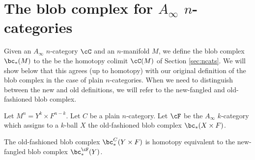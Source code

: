 
\section{The blob complex for $A_\infty$ $n$-categories}
\label{sec:ainfblob}

Given an $A_\infty$ $n$-category $\cC$ and an $n$-manifold $M$, we define the blob
complex $\bc_*(M)$ to the be the homotopy colimit $\cC(M)$ of Section \ref{sec:ncats}.
We will show below 
that this agrees (up to homotopy) with our original definition of the blob complex
in the case of plain $n$-categories.
When we need to distinguish between the new and old definitions, we will refer to the 
new-fangled and old-fashioned blob complex.

\medskip

Let $M^n = Y^k\times F^{n-k}$.  
Let $C$ be a plain $n$-category.
Let $\cF$ be the $A_\infty$ $k$-category which assigns to a $k$-ball
$X$ the old-fashioned blob complex $\bc_*(X\times F)$.

\begin{thm} \label{product_thm}
The old-fashioned blob complex $\bc_*^C(Y\times F)$ is homotopy equivalent to the
new-fangled blob complex $\bc_*^\cF(Y)$.
\end{thm}



